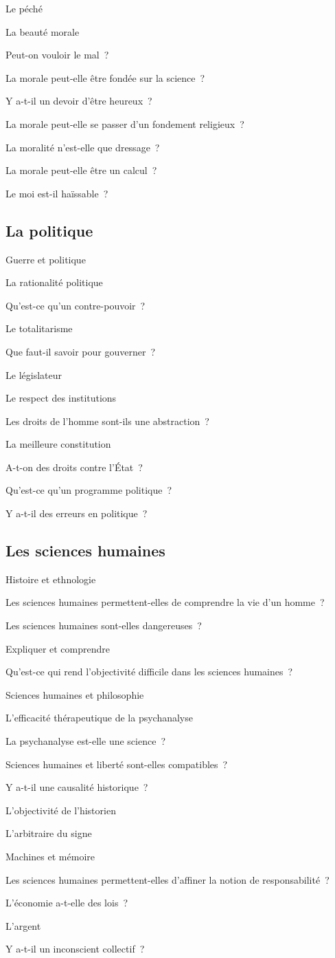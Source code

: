\documentclass[a4paper,12pt]{article}
\begin{document}
Le péché

La beauté morale

Peut-on vouloir le mal ?

La morale peut-elle être fondée sur la science ?

Y a-t-il un devoir d'être heureux ?

La morale peut-elle se passer d'un fondement religieux ?

La moralité n'est-elle que dressage ?

La morale peut-elle être un calcul ?

Le moi est-il haïssable ?

\subsection{La politique}
\label{sec-6-5}

Guerre et politique

La rationalité politique

Qu'est-ce qu'un contre-pouvoir ?

Le totalitarisme

Que faut-il savoir pour gouverner ?

Le législateur

Le respect des institutions

Les droits de l'homme sont-ils une abstraction ?

La meilleure constitution

A-t-on des droits contre l'État ?

Qu'est-ce qu'un programme politique ?

Y a-t-il des erreurs en politique ?

\subsection{Les sciences humaines}
\label{sec-6-6}

Histoire et ethnologie

Les sciences humaines permettent-elles de comprendre la vie d'un homme ?

Les sciences humaines sont-elles dangereuses ?

Expliquer et comprendre

Qu'est-ce qui rend l'objectivité difficile dans les sciences humaines ?

Sciences humaines et philosophie

L'efficacité thérapeutique de la psychanalyse

La psychanalyse est-elle une science ?

Sciences humaines et liberté sont-elles compatibles ?

Y a-t-il une causalité historique ?

L'objectivité de l'historien

L'arbitraire du signe

Machines et mémoire

Les sciences humaines permettent-elles d'affiner la notion de
responsabilité ?

L'économie a-t-elle des lois ?

L'argent

Y a-t-il un inconscient collectif ?
\end{document}

